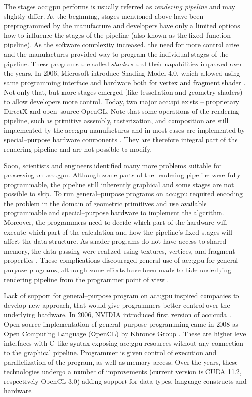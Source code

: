 The stages \acrshort{acc:gpu} performs is usually referred as \emph{rendering pipeline} and may slightly differ. At the beginning, stages mentioned above have been preprogrammed by the manufacture and developers have only a limited options how to influence the stages of the pipeline (also known as the fixed--function pipeline). As the software complexity increased, the need for more control arise and the manufactures provided way to program the individual stages of the pipeline. These programs are called \emph{shaders} and their capabilities improved over the years. In 2006, Microsoft introduce Shading Model 4.0, which allowed using same programming interface and hardware both for vertex and fragment shader \citep{DirectX10}. Not only that, but more stages emerged (like tessellation and geometry shaders) to allow developers more control. Today, two major \acrfull{acc:api} exists -- proprietary  DirectX and open--source OpenGL. Note that some operations of the rendering pipeline, such as primitive assembly, rasterization, and composition are still implemented by the \acrshort{acc:gpu} manufactures and in most cases are implemented by special--purpose hardware components \citep{SoftwareRasterization}. They are therefore integral part of the rendering pipeline and are not possible to modify.

Soon, scientists and engineers identified many more problems suitable for processing on \acrshort{acc:gpu}. Although some parts of the rendering pipeline were fully programmable, the pipeline still inherently graphical and some stages are not possible to skip. To run general--purpose programs on \acrshort{acc:gpu} required encoding the problem in the domain of geometric primitives and use available programmable and special--purpose hardware to implement the algorithm. Moreover, the programmers need to decide which part of the hardware will execute which part of the calculation and how the pipeline's fixed stages will affect the data structure. As shader programs do not have access to shared memory, the data passing were realized using textures, vertices, and fragment properties \citep{GPUComputingOwens}. These complications discouraged general use of \acrshort{acc:gpu} for general--purpose programs, although some efforts have been made to hide underlying rendering pipeline from the programmer point of view \citep{BrookGPU}.

Lack of support for general--purpose program on \acrshort{acc:gpu} inspired companies to develop new approach, that would give programmers better control over the underlying hardware. In 2006, NVIDIA introduced first version of \acrfull{acc:cuda} \citep{CUDAwiki}. Open source implementation of general--purpose programming came in 2008 as Open Computing Language (OpenCL) by Khronos Group \citep{OpenCLRelease}. These are higher level interfaces with C--like syntax exposing \acrshort{acc:gpu} resources without any connection to the graphical pipeline. Programmer is given control of execution and parallelization of the program, as well as memory access. Over the years, these technologies undergo a number of improvements (current version is CUDA 11.2, respectively OpenCL 3.0) adding support for data types, language constructs and hardware.

